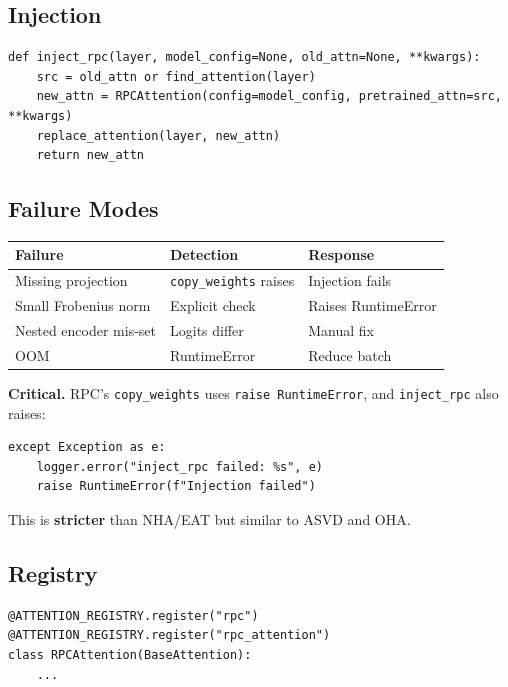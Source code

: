 \subsection{Injection}

\begin{lstlisting}
def inject_rpc(layer, model_config=None, old_attn=None, **kwargs):
    src = old_attn or find_attention(layer)
    new_attn = RPCAttention(config=model_config, pretrained_attn=src, **kwargs)
    replace_attention(layer, new_attn)
    return new_attn
\end{lstlisting}

\subsection{Failure Modes}

\begin{table}[H]
\centering
\small
\begin{tabular}{lll}
\toprule
\textbf{Failure} & \textbf{Detection} & \textbf{Response} \\
\midrule
Missing projection & \texttt{copy\_weights} raises & Injection fails \\
Small Frobenius norm & Explicit check & Raises RuntimeError \\
Nested encoder mis-set & Logits differ & Manual fix \\
OOM & RuntimeError & Reduce batch \\
\bottomrule
\end{tabular}
\end{table}

\textbf{Critical.} RPC's \texttt{copy\_weights} uses \texttt{raise RuntimeError}, and 
\texttt{inject\_rpc} also raises:

\begin{lstlisting}
except Exception as e:
    logger.error("inject_rpc failed: %s", e)
    raise RuntimeError(f"Injection failed")
\end{lstlisting}

This is \textbf{stricter} than NHA/EAT but similar to ASVD and OHA.

\subsection{Registry}

\begin{lstlisting}
@ATTENTION_REGISTRY.register("rpc")
@ATTENTION_REGISTRY.register("rpc_attention")
class RPCAttention(BaseAttention):
    ...
\end{lstlisting}

